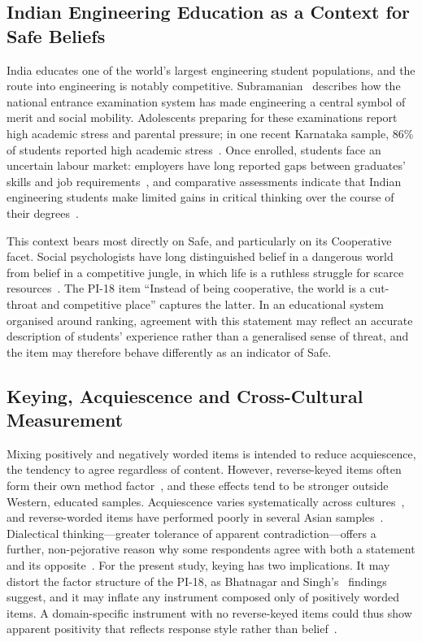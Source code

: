 \documentclass[journal,a4paper]{IEEEtran}
\begin{document}
\subsection{Indian Engineering Education as a Context for Safe Beliefs}

India educates one of the world's largest engineering student populations, and the route into engineering is notably competitive. Subramanian~\cite{subramanian2019} describes how the national entrance examination system has made engineering a central symbol of merit and social mobility. Adolescents preparing for these examinations report high academic stress and parental pressure; in one recent Karnataka sample, 86\% of students reported high academic stress~\cite{pienyu2024}. Once enrolled, students face an uncertain labour market: employers have long reported gaps between graduates' skills and job requirements~\cite{blom2011}, and comparative assessments indicate that Indian engineering students make limited gains in critical thinking over the course of their degrees~\cite{loyalka2021}.

This context bears most directly on Safe, and particularly on its Cooperative facet. Social psychologists have long distinguished belief in a dangerous world from belief in a competitive jungle, in which life is a ruthless struggle for scarce resources~\cite{duckitt2002,perry2013}. The PI-18 item ``Instead of being cooperative, the world is a cut-throat and competitive place'' captures the latter. In an educational system organised around ranking, agreement with this statement may reflect an accurate description of students' experience rather than a generalised sense of threat, and the item may therefore behave differently as an indicator of Safe.

\subsection{Keying, Acquiescence and Cross-Cultural Measurement}

Mixing positively and negatively worded items is intended to reduce acquiescence, the tendency to agree regardless of content. However, reverse-keyed items often form their own method factor~\cite{marsh1996,weijters2013}, and these effects tend to be stronger outside Western, educated samples. Acquiescence varies systematically across cultures~\cite{smith2004}, and reverse-worded items have performed poorly in several Asian samples~\cite{wong2003}. Dialectical thinking—greater tolerance of apparent contradiction—offers a further, non-pejorative reason why some respondents agree with both a statement and its opposite~\cite{spencer2010}. For the present study, keying has two implications. It may distort the factor structure of the PI-18, as Bhatnagar and Singh's~\cite{bhatnagar2024} findings suggest, and it may inflate any instrument composed only of positively worded items. A domain-specific instrument with no reverse-keyed items could thus show apparent positivity that reflects response style rather than belief~\cite{podsakoff2003}.
\end{document}
